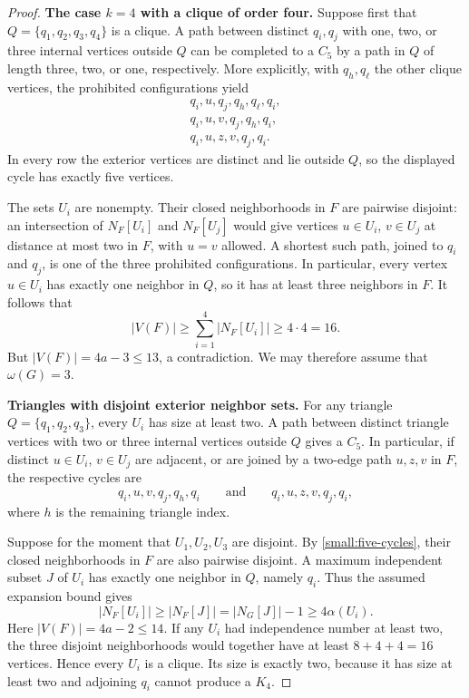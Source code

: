 \begin{proof}
\medskip
\noindent\textbf{The case $k=4$ with a clique of order four.}
Suppose first that $Q=\{q_1,q_2,q_3,q_4\}$ is a clique. A path
between distinct $q_i,q_j$ with one, two, or three internal vertices
outside $Q$ can be completed to a $C_5$ by a path in $Q$ of length
three, two, or one, respectively. More explicitly, with $q_h,q_\ell$
the other clique vertices, the prohibited configurations yield
\[
\begin{gathered}
  q_i,u,q_j,q_h,q_\ell,q_i,\\
  q_i,u,v,q_j,q_h,q_i,\\
  q_i,u,z,v,q_j,q_i.
\end{gathered}
\]
In every row the exterior vertices are distinct and lie outside
$Q$, so the displayed cycle has exactly five vertices.

The sets $U_i$ are nonempty. Their closed neighborhoods in $F$ are
pairwise disjoint: an intersection of $N_F[U_i]$ and $N_F[U_j]$
would give vertices $u\in U_i$, $v\in U_j$ at distance at most two
in $F$, with $u=v$ allowed. A shortest such path, joined to $q_i$
and $q_j$, is one of the three prohibited configurations. In
particular, every vertex $u\in U_i$ has exactly one neighbor in
$Q$, so it has at least three neighbors in $F$. It follows that
\[
  |V(F)|\ge\sum_{i=1}^4|N_F[U_i]|\ge4\cdot4=16.
\]
But $|V(F)|=4a-3\le13$, a contradiction. We may therefore assume
that $\omega(G)=3$.

\medskip
\noindent\textbf{Triangles with disjoint exterior neighbor sets.}
For any triangle $Q=\{q_1,q_2,q_3\}$, every $U_i$ has size at
least two. A path between distinct triangle vertices with two or
three internal vertices outside $Q$ gives a $C_5$. In particular,
if distinct $u\in U_i$, $v\in U_j$ are adjacent, or are joined by
a two-edge path $u,z,v$ in $F$, the respective cycles are
\begin{equation}
  q_i,u,v,q_j,q_h,q_i
  \qquad\text{and}\qquad
  q_i,u,z,v,q_j,q_i,
  \label{small:five-cycles}
\end{equation}
where $h$ is the remaining triangle index.

Suppose for the moment that $U_1,U_2,U_3$ are disjoint. By
\eqref{small:five-cycles}, their closed neighborhoods in $F$ are
also pairwise disjoint. A maximum independent subset $J$ of $U_i$
has exactly one neighbor in $Q$, namely $q_i$. Thus the assumed
expansion bound gives
\begin{equation}
  |N_F[U_i]|\ge |N_F[J]|
  =|N_G[J]|-1\ge4\alpha(U_i).
  \label{small:one-neighbor-count}
\end{equation}
Here $|V(F)|=4a-2\le14$. If any $U_i$ had independence number at
least two, the three disjoint neighborhoods would together have
at least $8+4+4=16$ vertices. Hence every $U_i$ is a clique. Its
size is exactly two, because it has size at least two and adjoining
$q_i$ cannot produce a $K_4$.


\end{proof}
